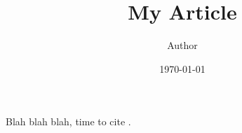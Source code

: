 \documentclass[11pt]{article}
\begin{document}
\title{My Article}
\author{Author}
\date{\today}
\maketitle

Blah blah blah, time to cite \citep{schmidhuber}.


\end{document}
